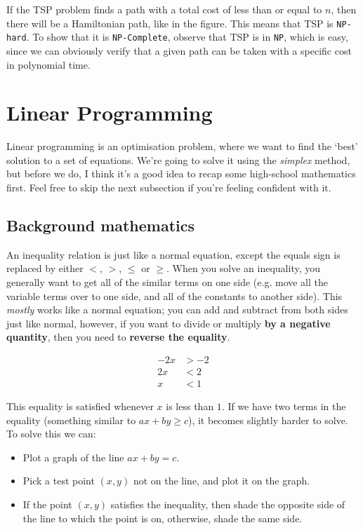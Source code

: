 If the TSP problem finds a path with a total cost of less than or equal to $n$,
then there will be a Hamiltonian path, like in the figure. This means that TSP
is \texttt{NP-hard}. To show that it is \texttt{NP-Complete}, observe that TSP
is in \texttt{NP}, which is easy, since we can obviously verify that a given
path can be taken with a specific cost in polynomial time.

\section{Linear Programming}

Linear programming is an optimisation problem, where we want to find the `best'
solution to a set of equations. We're going to solve it using the
\textit{simplex} method, but before we do, I think it's a good idea to recap
some high-school mathematics first. Feel free to skip the next subsection if
you're feeling confident with it.

\subsection{Background mathematics}

An inequality relation is just like a normal equation, except the equals sign is
replaced by either $<$, $>$, $\leq$ or $\geq$. When you solve an inequality, you
generally want to get all of the similar terms on one side (e.g. move all the
variable terms over to one side, and all of the constants to another side). This
\textit{mostly} works like a normal equation; you can add and subtract from both
sides just like normal, however, if you want to divide or multiply \textbf{by a
negative quantity}, then you need to \textbf{reverse the equality}.

\[
  \begin{split}
    -2x &> -2\\
    2x &< 2\\
    x &< 1
  \end{split}
\]

This equality is satisfied whenever $x$ is less than $1$. If we have two terms
in the equality (something similar to $ax + by \geq c$), it becomes slightly
harder to solve. To solve this we can:

\begin{itemize}
  \item Plot a graph of the line $ax + by = c$.
  \item Pick a test point $(x, y)$ not on the line, and plot it on the graph.
  \item If the point $(x, y)$ satisfies the inequality, then shade the opposite 
    side of the line to which the point is on, otherwise, shade the same side.
\end{itemize}

